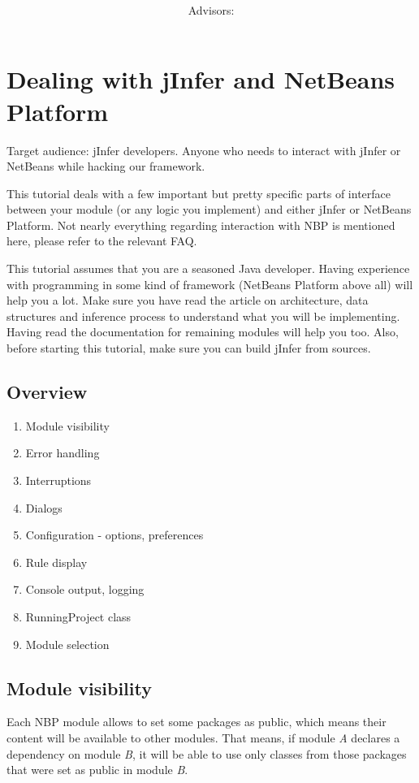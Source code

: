 \documentclass[a4paper,10pt,oneside]{article}
\title{\bf\mftitle}
\author{\mfauthor \\ Advisors: \mfadvisor}
\date{\mfplacedate}
\begin{document}
\maketitle
 


\section*{Dealing with jInfer and NetBeans Platform}
\par 
  Target audience: jInfer developers. Anyone who needs to interact with jInfer
  or NetBeans while hacking our framework.

\par 
  This tutorial deals with a few important but pretty specific parts of interface
  between your module (or any logic you implement) and either jInfer or NetBeans
  Platform. Not nearly everything regarding interaction with NBP is mentioned here,
  please refer to the relevant FAQ.

\par 
  
    This tutorial assumes that you are a seasoned Java developer. Having
    experience with programming in some kind of framework (NetBeans Platform
    above all) will help you a lot.
    Make sure you have read the article on
    architecture, data structures and inference process to understand what you
    will be implementing. Having read the documentation for
    remaining modules will help you too.
    Also, before starting this tutorial, make sure you can
    build jInfer from sources.
  

\subsection*{Overview}
\begin{enumerate}
  \item Module visibility
  \item Error handling
  \item Interruptions
  \item Dialogs
  \item Configuration - options, preferences
  \item Rule display
  \item Console output, logging
  \item RunningProject class
  \item Module selection
\end{enumerate}
\subsection*{Module visibility}
\par 
  Each NBP module allows to set some packages as public, which means their content
  will be available to other modules. That means, if module \textit{A} declares a
  dependency on module \textit{B}, it will be able to use only classes from
  those packages that were set as public in module \textit{B}.
\end{document}
